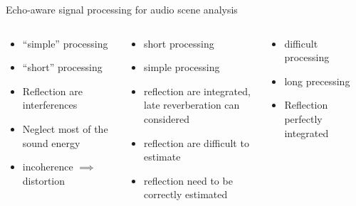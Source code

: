 \begin{frame}[t]{\alert{Echo-aware signal processing for audio scene analysis}}
    \vfill
    \begin{columns}[T,onlytextwidth]
        \begin{column}{0.3\textwidth}
            \small
            \begin{itemize}
                \item[\cmark] \textcolor{mygreen}{``simple'' processing} %
                \item[\cmark] \textcolor{mygreen}{``short'' processing} %
                \item[\xmark] \textcolor{myred}{Reflection are interferences}
                \item[\xmark] \textcolor{myred}{Neglect most of the sound energy}
                \item[\xmark] \textcolor{myred}{incoherence $\implies$ distortion}
            \end{itemize}
        \end{column}\hfill
        \begin{column}{0.3\textwidth}
            \small
            \begin{itemize}
                \item short processing %
                \item simple processing
                \item reflection are integrated,
                \\late reverberation can considered
                \item reflection are difficult to estimate
                \item reflection need to be correctly estimated
            \end{itemize}
        \end{column}\hfill
        \begin{column}{0.3\textwidth}
            \small
            \begin{itemize}
                \item difficult processing %
                \item long precessing
                \item Reflection perfectly integrated
            \end{itemize}
        \end{column}
    \end{columns}


\end{frame}
